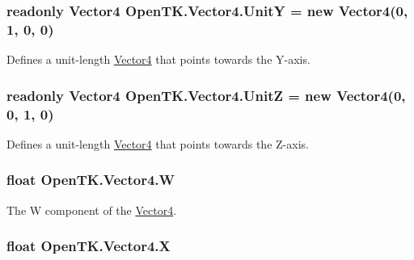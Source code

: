 \hypertarget{struct_open_t_k_1_1_vector4_a1396b403dd251cb508210d93751494e5}{
\subsubsection[{Unit\-Y}]{\setlength{\rightskip}{0pt plus 5cm}readonly {\bf Vector4} Open\-T\-K.\-Vector4.\-Unit\-Y = new {\bf Vector4}(0, 1, 0, 0)\hspace{0.3cm}{\ttfamily [static]}}}\label{struct_open_t_k_1_1_vector4_a1396b403dd251cb508210d93751494e5}


Defines a unit-\/length \hyperlink{struct_open_t_k_1_1_vector4}{Vector4} that points towards the Y-\/axis. 

\hypertarget{struct_open_t_k_1_1_vector4_ad269575f7cc9936e91f79f89c3fb1b48}{
\subsubsection[{Unit\-Z}]{\setlength{\rightskip}{0pt plus 5cm}readonly {\bf Vector4} Open\-T\-K.\-Vector4.\-Unit\-Z = new {\bf Vector4}(0, 0, 1, 0)\hspace{0.3cm}{\ttfamily [static]}}}\label{struct_open_t_k_1_1_vector4_ad269575f7cc9936e91f79f89c3fb1b48}


Defines a unit-\/length \hyperlink{struct_open_t_k_1_1_vector4}{Vector4} that points towards the Z-\/axis. 

\hypertarget{struct_open_t_k_1_1_vector4_a637c8b7da3fc2c3745776d95438032a7}{
\subsubsection[{W}]{\setlength{\rightskip}{0pt plus 5cm}float Open\-T\-K.\-Vector4.\-W}}\label{struct_open_t_k_1_1_vector4_a637c8b7da3fc2c3745776d95438032a7}


The W component of the \hyperlink{struct_open_t_k_1_1_vector4}{Vector4}. 

\hypertarget{struct_open_t_k_1_1_vector4_a8dabc9b9a0cf582c6e00d3670ead72ca}{
\subsubsection[{X}]{\setlength{\rightskip}{0pt plus 5cm}float Open\-T\-K.\-Vector4.\-X}}\label{struct_open_t_k_1_1_vector4_a8dabc9b9a0cf582c6e00d3670ead72ca}



